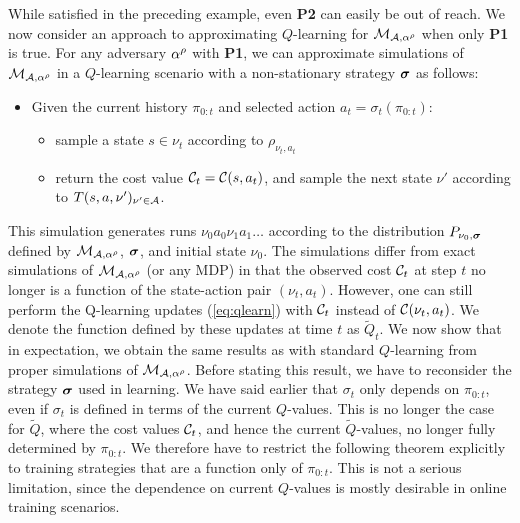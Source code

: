 \documentclass{llncs}
\begin{document}

While satisfied in the preceding example, even {\bf P2} can easily be out of reach. We now consider
an approach to approximating $Q$-learning for $\mathcal{M}_{\mathcal{A},\alpha^{\rho}}$ when only {\bf P1} is true.
For any adversary $\alpha^{\rho}$ with {\bf P1}, we can approximate simulations of
$\mathcal{M}_{\mathcal{A},\alpha^\rho}$ in a $Q$-learning scenario with a
non-stationary strategy $\boldsymbol{\sigma}$ as follows:

\begin{itemize}
\item Given the current history $\pi_{0:t}$ and selected action $a_t=\sigma_t(\pi_{0:t})$:
\begin{itemize}
\item sample a state $s\in\nu_t$ according to $\rho_{\nu_t,a_t}$
\item return the cost value $\mathcal{C}_t=\mathcal{C}(s,a_t)$, and sample the next state $\nu'$ according to
$T(s,a,\nu')_{\nu'\in\mathcal{A}}$.
\end{itemize}
\end{itemize}

This simulation generates runs $\nu_0a_0\nu_1a_1\ldots$ according to the distribution
$P_{\nu_0,\boldsymbol{\sigma}}$ defined by  $\mathcal{M}_{\mathcal{A},\alpha^\rho}$, $\boldsymbol{\sigma}$, and initial state $\nu_0$.
The simulations differ from exact simulations of $\mathcal{M}_{\mathcal{A},\alpha^\rho}$ (or any
MDP) in that the observed cost $\mathcal{C}_t$ at step $t$ no longer is a function of the state-action pair
$(\nu_t,a_t)$.  However, one can still perform the Q-learning updates (\ref{eq:qlearn}) with
$\mathcal{C}_t$ instead of $\mathcal{C}(\nu_t,a_t)$. We denote the function defined by these updates at time
$t$ as $\tilde{Q}_t$. We now show that in expectation, we obtain the same results as with
standard $Q$-learning from proper simulations of  $\mathcal{M}_{\mathcal{A},\alpha^\rho}$. Before stating this
result, we have to reconsider the strategy $\boldsymbol{\sigma}$ used in learning. We have said earlier that
$\sigma_t$ only depends on $\pi_{0:t}$, even if $\sigma_t$ is defined in terms of the current $Q$-values.
This is no longer the case for $\tilde{Q}$, where the cost values $\mathcal{C}_t$, and hence the current
$\tilde{Q}$-values, no longer fully determined by $\pi_{0:t}$. We therefore have to restrict the following
theorem explicitly to training strategies that are a function only of $\pi_{0:t}$. This is not a serious
limitation, since the dependence on current $Q$-values is mostly desirable in online training
scenarios.
\end{document}

